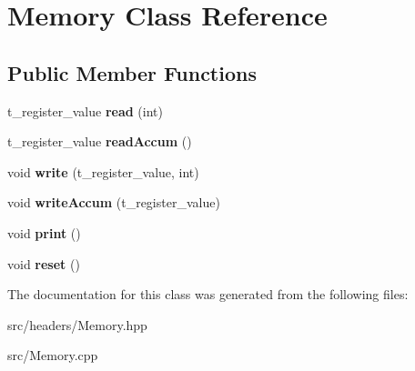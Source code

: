 \hypertarget{classMemory}{\section{Memory Class Reference}
\label{classMemory}
}
\subsection*{Public Member Functions}
\begin{DoxyCompactItemize}
\item 
\hypertarget{classMemory_a0a24b1f1fd76065f5c8b698d5b3eb8e0}{t\-\_\-register\-\_\-value {\bfseries read} (int)}\label{classMemory_a0a24b1f1fd76065f5c8b698d5b3eb8e0}

\item 
\hypertarget{classMemory_af7a465a9cb00fc8fb309949bfa0fa135}{t\-\_\-register\-\_\-value {\bfseries read\-Accum} ()}\label{classMemory_af7a465a9cb00fc8fb309949bfa0fa135}

\item 
\hypertarget{classMemory_ab5d352ec0e45e8507a30e807e23e593f}{void {\bfseries write} (t\-\_\-register\-\_\-value, int)}\label{classMemory_ab5d352ec0e45e8507a30e807e23e593f}

\item 
\hypertarget{classMemory_aea8f97249d2188cd8ee74147f7c73012}{void {\bfseries write\-Accum} (t\-\_\-register\-\_\-value)}\label{classMemory_aea8f97249d2188cd8ee74147f7c73012}

\item 
\hypertarget{classMemory_a4b6f224f9e77da560d18b517bcaaafc4}{void {\bfseries print} ()}\label{classMemory_a4b6f224f9e77da560d18b517bcaaafc4}

\item 
\hypertarget{classMemory_a2d53c704906468fb5dedf8e3649fb7b3}{void {\bfseries reset} ()}\label{classMemory_a2d53c704906468fb5dedf8e3649fb7b3}

\end{DoxyCompactItemize}


The documentation for this class was generated from the following files\-:\begin{DoxyCompactItemize}
\item 
src/headers/Memory.\-hpp\item 
src/Memory.\-cpp\end{DoxyCompactItemize}
